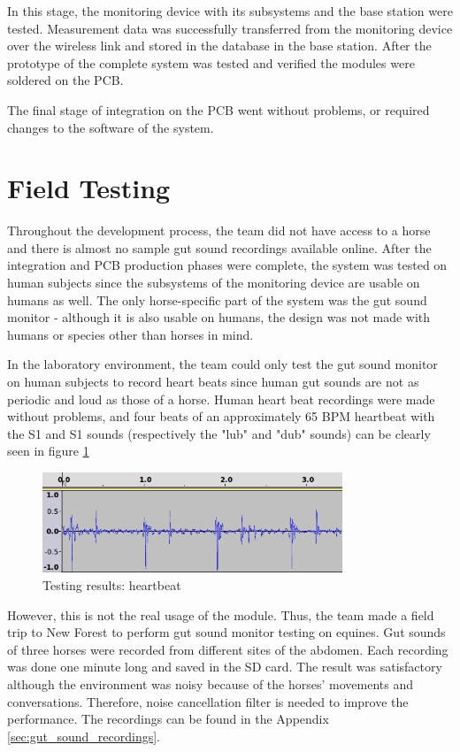 In this stage, the monitoring device with its subsystems and the base station were tested. Measurement data was successfully transferred from the monitoring device over the wireless link and stored in the database in the base station. After the prototype of the complete system was tested and verified the modules were soldered on the PCB.

The final stage of integration on the PCB went without problems, or required changes to the software of the system.  



\section{Field Testing}
Throughout the development process, the team did not have access to a horse and there is almost no sample gut sound recordings available online. After the integration and PCB production phases were complete, the system was tested on human subjects since the subsystems of the monitoring device are usable on humans as well. The only horse-specific part of the system was the gut sound monitor - although it is also usable on humans, the design was not made with humans or species other than horses in mind. 

In the laboratory environment, the team could only test the gut sound monitor on human subjects to record heart beats since human gut sounds are not as periodic and loud as those of a horse. Human heart beat recordings were made without problems, and four beats of an approximately 65 BPM heartbeat with the S1 and S1 sounds (respectively the "lub" and "dub" sounds) can be clearly seen in figure \ref{fig:heartbeat}

\begin{figure}
\centering
\includegraphics[width=0.8\textwidth]{Images/heartbeat.png}
\caption{Testing results: heartbeat}
\label{fig:heartbeat}
\end{figure}

However, this is not the real usage of the module. Thus, the team made a field trip to New Forest to perform gut sound monitor testing on equines. Gut sounds of three horses were recorded from different sites of the abdomen. Each recording was done one minute long and saved in the SD card. The result was satisfactory although the environment was noisy because of the horses' movements and conversations. Therefore, noise cancellation filter is needed to improve the performance. The recordings can be found in the Appendix \ref{sec:gut_sound_recordings}.



